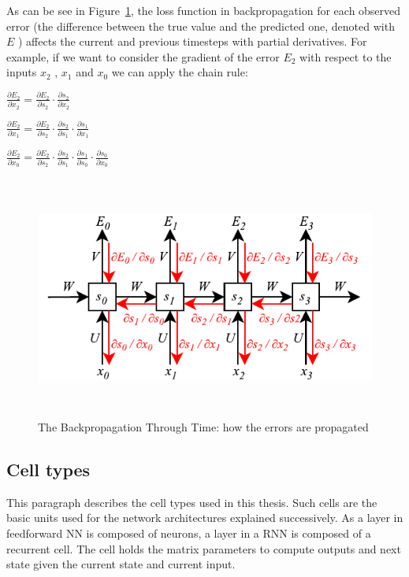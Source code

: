 As can be see in Figure~\ref{fig:bptt}, the loss function in backpropagation for each observed error (the difference between the true value and the predicted one, denoted with  \( E \) ) affects the current and previous timesteps with partial derivatives. For example, if we want to consider the gradient of the error  \( E_{2} \) with respect to the inputs  \( x_{2} \) ,  \( x_{1} \) and  \( x_{0} \)  we can apply the chain rule:

 \(  \frac{ \partial E_{2}}{ \partial x_{2}}=\frac{ \partial E_{2}}{ \partial s_{2}}\cdot \frac{ \partial s_{2}}{ \partial x_{2}} \) 

 \(  \frac{ \partial E_{2}}{ \partial x_{1}}=\frac{ \partial E_{2}}{ \partial s_{2}}\cdot \frac{ \partial s_{2}}{ \partial s_{1}}\cdot \frac{ \partial s_{1}}{ \partial x_{1}} \) 

 \(  \frac{ \partial E_{2}}{ \partial x_{0}}=\frac{ \partial E_{2}}{ \partial s_{2}}\cdot \frac{ \partial s_{2}}{ \partial s_{1}}\cdot \frac{ \partial s_{1}}{ \partial s_{0}}\cdot \frac{ \partial s_{0}}{ \partial x_{0}} \) 

\begin{figure}[!htbp]
    \centering
    \includegraphics[max width=\linewidth,max height=8cm,keepaspectratio]{figures/bptt}
    \caption{The Backpropagation Through Time: how the errors are propagated}\label{fig:bptt}
\end{figure}

\subsection{Cell types}
This paragraph describes the  cell types used in this thesis. Such cells are the basic units used for the network architectures explained successively. As a layer in feedforward NN is composed of neurons, a layer in a RNN is composed of a recurrent cell. The cell holds the matrix parameters to compute outputs and next state given the current state and current input.

